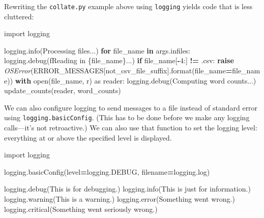 \documentclass[
]{krantz}
\makeatletter
\newenvironment{Shaded}{\begin{snugshade}}{\end{snugshade}}
\newcommand{\BuiltInTok}[1]{#1}
\newcommand{\ControlFlowTok}[1]{\textcolor[rgb]{0.13,0.29,0.53}{\textbf{#1}}}
\newcommand{\DecValTok}[1]{\textcolor[rgb]{0.00,0.00,0.81}{#1}}
\newcommand{\ImportTok}[1]{#1}
\newcommand{\KeywordTok}[1]{\textcolor[rgb]{0.13,0.29,0.53}{\textbf{#1}}}
\newcommand{\NormalTok}[1]{#1}
\newcommand{\OperatorTok}[1]{\textcolor[rgb]{0.81,0.36,0.00}{\textbf{#1}}}
\newcommand{\PreprocessorTok}[1]{\textcolor[rgb]{0.56,0.35,0.01}{\textit{#1}}}
\newcommand{\SpecialCharTok}[1]{\textcolor[rgb]{0.00,0.00,0.00}{#1}}
\newcommand{\SpecialStringTok}[1]{\textcolor[rgb]{0.31,0.60,0.02}{#1}}
\newcommand{\StringTok}[1]{\textcolor[rgb]{0.31,0.60,0.02}{#1}}
\newenvironment{kframe}{%
\medskip{}
\setlength{\fboxsep}{.8em}
 \def\at@end@of@kframe{}%
 \ifinner\ifhmode%
  \def\at@end@of@kframe{\end{minipage}}%
  \begin{minipage}{\columnwidth}%
 \fi\fi%
 \def\FrameCommand##1{\hskip\@totalleftmargin \hskip-\fboxsep
 \colorbox{shadecolor}{##1}\hskip-\fboxsep
     \hskip-\linewidth \hskip-\@totalleftmargin \hskip\columnwidth}%
 \MakeFramed {\advance\hsize-\width
   \@totalleftmargin\z@ \linewidth\hsize
   \@setminipage}}%
 {\par\unskip\endMakeFramed%
 \at@end@of@kframe}
\renewenvironment{Shaded}{\begin{kframe}}{\end{kframe}}
\makeatother
\begin{document}
Rewriting the \texttt{collate.py} example above using \texttt{logging}
yields code that is less cluttered:

\begin{Shaded}
\begin{Highlighting}[]
\ImportTok{import}\NormalTok{ logging}


\NormalTok{logging.info(}\StringTok{\textquotesingle{}Processing files...\textquotesingle{}}\NormalTok{)}
\ControlFlowTok{for}\NormalTok{ file\_name }\KeywordTok{in}\NormalTok{ args.infiles:}
\NormalTok{    logging.debug(}\SpecialStringTok{f\textquotesingle{}Reading in }\SpecialCharTok{\{}\NormalTok{file\_name}\SpecialCharTok{\}}\SpecialStringTok{...\textquotesingle{}}\NormalTok{)}
    \ControlFlowTok{if}\NormalTok{ file\_name[}\OperatorTok{{-}}\DecValTok{4}\NormalTok{:] }\OperatorTok{!=} \StringTok{\textquotesingle{}.csv\textquotesingle{}}\NormalTok{:}
        \ControlFlowTok{raise} \PreprocessorTok{OSError}\NormalTok{(ERROR\_MESSAGES[}\StringTok{\textquotesingle{}not\_csv\_file\_suffix\textquotesingle{}}\NormalTok{].}\BuiltInTok{format}\NormalTok{(file\_name}\OperatorTok{=}\NormalTok{file\_name))}
    \ControlFlowTok{with} \BuiltInTok{open}\NormalTok{(file\_name, }\StringTok{\textquotesingle{}r\textquotesingle{}}\NormalTok{) }\ImportTok{as}\NormalTok{ reader:}
\NormalTok{        logging.debug(}\StringTok{\textquotesingle{}Computing word counts...\textquotesingle{}}\NormalTok{)}
\NormalTok{        update\_counts(reader, word\_counts)}
\end{Highlighting}
\end{Shaded}

We can also configure logging to send messages to a file instead of standard error
using \texttt{logging.basicConfig}.
(This has to be done before we make any logging calls---it's not retroactive.)
We can also use that function to set the logging level:
everything at or above the specified level is displayed.

\begin{Shaded}
\begin{Highlighting}[]
\ImportTok{import}\NormalTok{ logging}


\NormalTok{logging.basicConfig(level}\OperatorTok{=}\NormalTok{logging.DEBUG, filename}\OperatorTok{=}\StringTok{\textquotesingle{}logging.log\textquotesingle{}}\NormalTok{)}

\NormalTok{logging.debug(}\StringTok{\textquotesingle{}This is for debugging.\textquotesingle{}}\NormalTok{)}
\NormalTok{logging.info(}\StringTok{\textquotesingle{}This is just for information.\textquotesingle{}}\NormalTok{)}
\NormalTok{logging.warning(}\StringTok{\textquotesingle{}This is a warning.\textquotesingle{}}\NormalTok{)}
\NormalTok{logging.error(}\StringTok{\textquotesingle{}Something went wrong.\textquotesingle{}}\NormalTok{)}
\NormalTok{logging.critical(}\StringTok{\textquotesingle{}Something went seriously wrong.\textquotesingle{}}\NormalTok{)}
\end{Highlighting}
\end{Shaded}
\end{document}
